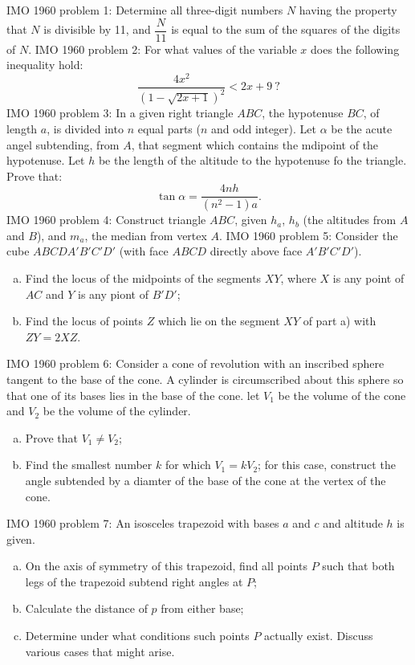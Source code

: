 IMO 1960 problem 1:  Determine all three-digit numbers $N$ having the property that $N$ is divisible by 11, and $\dfrac{N}{11}$ is equal to the sum of the squares of the digits of $N$. 
IMO 1960 problem 2:  For what values of the variable $x$ does the following inequality hold:
\[ \dfrac{4x^2}{(1-\sqrt{2x+1})^2}<2x+9 \ ? \] 
IMO 1960 problem 3:  In a given right triangle $ABC$, the hypotenuse $BC$, of length $a$, is divided into $n$ equal parts ($n$ and odd integer). Let $\alpha$ be the acute angel subtending, from $A$, that segment which contains the mdipoint of the hypotenuse. Let $h$ be the length of the altitude to the hypotenuse fo the triangle. Prove that:
\[ \tan{\alpha}=\dfrac{4nh}{(n^2-1)a}. \] 
IMO 1960 problem 4:  Construct triangle $ABC$, given $h_a$, $h_b$ (the altitudes from $A$ and $B$), and $m_a$, the median from vertex $A$. 
IMO 1960 problem 5:  Consider the cube $ABCDA'B'C'D'$ (with face $ABCD$ directly above face $A'B'C'D'$).
\begin{enumerate}[a)]
  \item Find the locus of the midpoints of the segments $XY$, where $X$ is any point of $AC$ and $Y$ is any piont of $B'D'$;
  \item Find the locus of points $Z$ which lie on the segment $XY$ of part a) with $ZY=2XZ$.
\end{enumerate} 
IMO 1960 problem 6:  Consider a cone of revolution with an inscribed sphere tangent to the base of the cone. A cylinder is circumscribed about this sphere so that one of its bases lies in the base of the cone. let $V_1$ be the volume of the cone and $V_2$ be the volume of the cylinder.
\begin{enumerate}[a)]
  \item Prove that $V_1 \neq V_2$;
  \item Find the smallest number $k$ for which $V_1=kV_2$; for this case, construct the angle subtended by a diamter of the base of the cone at the vertex of the cone.
\end{enumerate} 
IMO 1960 problem 7:  An isosceles trapezoid with bases $a$ and $c$ and altitude $h$ is given.
\begin{enumerate}[a)]
  \item On the axis of symmetry of this trapezoid, find all points $P$ such that both legs of the trapezoid subtend right angles at $P$;
  \item Calculate the distance of $p$ from either base;
  \item Determine under what conditions such points $P$ actually exist. Discuss various cases that might arise.
\end{enumerate} 

